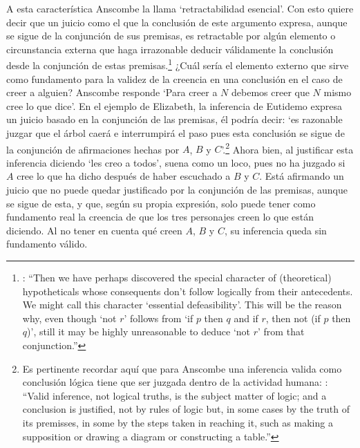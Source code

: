 A esta característica Anscombe la llama `retractabilidad esencial'. Con esto quiere decir que un juicio como el que la conclusión de este argumento expresa, aunque se sigue de la conjunción de sus premisas, es retractable por algún elemento o circunstancia externa que haga irrazonable deducir válidamente la conclusión desde la conjunción de estas premisas.\footnote{\cite[Cf.~][299]{anscombe2015logic:qpa}: \enquote{Then we have perhaps discovered the special character of (theoretical) hypotheticals whose consequents don't follow logically from their antecedents. We might call this character `essential defeasibility'. This will be the reason why, even though `not $r$' follows from `if $p$ then $q$ and if $r$, then not (if $p$ then $q$)', still it may be highly unreasonable to deduce `not $r$' from that conjunction.}} ¿Cuál sería el elemento externo que sirve como fundamento para la validez de la creencia en una conclusión en el caso de creer a alguien? Anscombe responde \enquote*{Para creer a $N$ debemos creer que $N$ mismo cree lo que dice}. En el ejemplo de Elizabeth, la inferencia de Eutidemo expresa un juicio basado en la conjunción de las premisas, él podría decir: \enquote*{es razonable juzgar que el árbol caerá e interrumpirá el paso pues esta conclusión se sigue de la conjunción de afirmaciones hechas por $A$, $B$ y $C$}.\footnote{Es pertinente recordar aquí que para Anscombe una inferencia valida como conclusión lógica tiene que ser juzgada dentro de la actividad humana: \cite[121]{anscombe1981parmenides:qli}: \enquote{Valid inference, not logical truths, is the subject matter of logic; and a conclusion is justified, not by rules of logic but, in some cases by the truth of its premisses, in some by the steps taken in reaching it, such as making a supposition or drawing a diagram or constructing a table.}} Ahora bien, al justificar esta inferencia diciendo \enquote*{les creo a todos}, suena como un loco, pues no ha juzgado si $A$ cree lo que ha dicho después de haber escuchado a $B$ y $C$. Está afirmando un juicio que no puede quedar justificado por la conjunción de las premisas, aunque se sigue de esta, y que, según su propia expresión, solo puede tener como fundamento real la creencia de que los tres personajes creen lo que están diciendo. Al no tener en cuenta qué creen $A$, $B$ y $C$, su inferencia queda sin fundamento válido.

